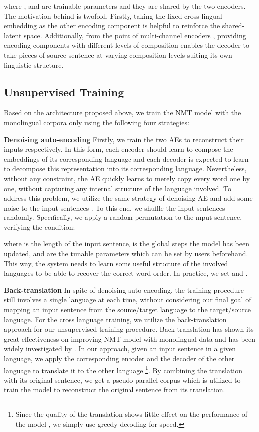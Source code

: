 \documentclass[11pt,a4paper]{article}
\begin{document}
where ,  and  are trainable parameters and they are shared by the two encoders. The motivation behind is twofold. Firstly, taking the fixed cross-lingual embedding as the other encoding component is helpful to reinforce the shared-latent space. Additionally, from the point of multi-channel encoders \cite{xiong2017multi}, providing encoding components with different levels of composition enables the decoder to take pieces of source sentence at varying composition levels suiting its own linguistic structure.

\subsection{Unsupervised Training}
\label{sec:training procedure}
Based on the architecture proposed above, we train the NMT model with the monolingual corpora only using the following four strategies:

\textbf{Denoising auto-encoding} Firstly, we train the two AEs to reconstruct their inputs respectively. In this form, each encoder should learn to compose the embeddings of its corresponding language and each decoder is expected to learn to decompose this representation into its corresponding language. Nevertheless, without any constraint, the AE quickly learns to merely copy every word one by one, without capturing any internal structure of the language involved. To address this problem, we utilize the same strategy of denoising AE \cite{vincent2008extracting} and add some noise to the input sentences \cite{hill2016learning,Artetxe2017Unsupervised}. To this end, we shuffle the input sentences randomly. Specifically, we apply a random permutation  to the input sentence, verifying the condition:

where  is the length of the input sentence,  is the global steps the model has been updated,  and  are the tunable parameters which can be set by users beforehand. This way, the system needs to learn some useful structure of the involved languages to be able to recover the correct word order. In practice, we set  and .

\textbf{Back-translation} In spite of denoising auto-encoding, the training procedure still involves a single language at each time, without considering our final goal of mapping an input sentence from the source/target language to the target/source language. For the cross language training, we utilize the back-translation approach for our unsupervised training procedure. Back-translation has shown its great effectiveness on improving NMT model with monolingual data and has been widely investigated by \cite{sennrich2015improving,Zhang2016Exploiting}.
In our approach, given an input sentence in a given language, we apply the corresponding encoder and the decoder of the other language to translate it to the other language \footnote{Since the quality of the translation shows little effect on the performance of the model \cite{sennrich2015improving}, we simply use greedy decoding for speed.}. By combining the translation with its original sentence, we get a pseudo-parallel corpus which is utilized to train the model to reconstruct the original sentence from its translation.
\end{document}
